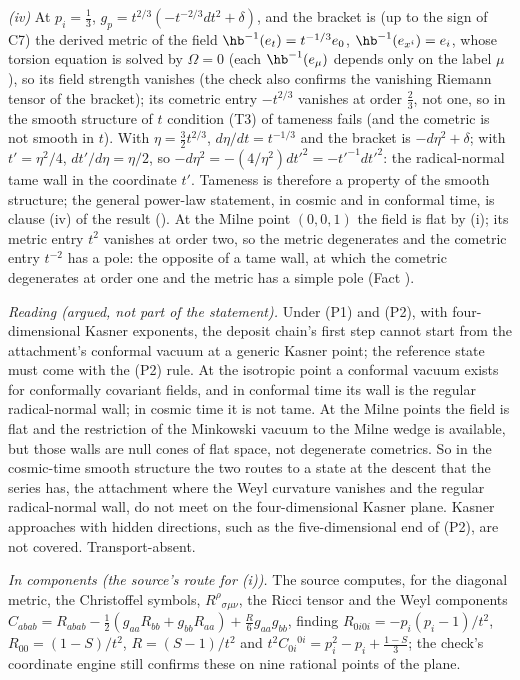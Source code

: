 \emph{(iv)} At $p_{i} = \tfrac13$, $g_{p} = t^{2/3}(-t^{-2/3}dt^{2} + \delta)$, and the bracket is (up to the sign of C7) the derived metric of the field $\hb^{-1}(e_{t}) = t^{-1/3}e_{0}$, $\hb^{-1}(e_{x^{i}}) = e_{i}$, whose torsion equation is solved by $\Omega = 0$ (each $\hb^{-1}(e_\mu)$ depends only on the label $\mu$), so its field strength vanishes (the check also confirms the vanishing Riemann tensor of the bracket); its cometric entry $-t^{2/3}$ vanishes at order $\tfrac23$, not one, so in the smooth structure of $t$ condition (T3) of tameness fails (and the cometric is not smooth in $t$). With $\eta = \tfrac32 t^{2/3}$, $d\eta/dt = t^{-1/3}$ and the bracket is $-d\eta^{2} + \delta$; with $t' = \eta^{2}/4$, $dt'/d\eta = \eta/2$, so $-d\eta^{2} = -(4/\eta^{2})dt'^{2} = -t'^{-1}dt'^{2}$: the radical-normal tame wall in the coordinate $t'$. Tameness is therefore a property of the smooth structure; the general power-law statement, in cosmic and in conformal time, is clause (iv) of the result (). At the Milne point $(0, 0, 1)$ the field is flat by (i); its metric entry $t^{2}$ vanishes at order two, so the metric degenerates and the cometric entry $t^{-2}$ has a pole: the opposite of a tame wall, at which the cometric degenerates at order one and the metric has a simple pole (Fact ).

\emph{Reading (argued, not part of the statement).} Under (P1) and (P2), with four-dimensional Kasner exponents, the deposit chain's first step cannot start from the attachment's conformal vacuum at a generic Kasner point; the reference state must come with the (P2) rule. At the isotropic point a conformal vacuum exists for conformally covariant fields, and in conformal time its wall is the regular radical-normal wall; in cosmic time it is not tame. At the Milne points the field is flat and the restriction of the Minkowski vacuum to the Milne wedge is available, but those walls are null cones of flat space, not degenerate cometrics. So in the cosmic-time smooth structure the two routes to a state at the descent that the series has, the attachment where the Weyl curvature vanishes and the regular radical-normal wall, do not meet on the four-dimensional Kasner plane. Kasner approaches with hidden directions, such as the five-dimensional end of (P2), are not covered. Transport-absent.

\emph{In components (the source's route for (i)).} The source computes, for the diagonal metric, the Christoffel symbols, $R^{\rho}{}_{\sigma\mu\nu}$, the Ricci tensor and the Weyl components $C_{abab} = R_{abab} - \tfrac12(g_{aa}R_{bb} + g_{bb}R_{aa}) + \tfrac{R}{6}g_{aa}g_{bb}$, finding $R_{0i0i} = -p_{i}(p_{i} - 1)/t^{2}$, $R_{00} = (1 - S)/t^{2}$, $R = (S - 1)/t^{2}$ and $t^{2}C_{0i}{}^{0i} = p_{i}^{2} - p_{i} + \tfrac{1 - S}{3}$; the check's coordinate engine still confirms these on nine rational points of the plane.
